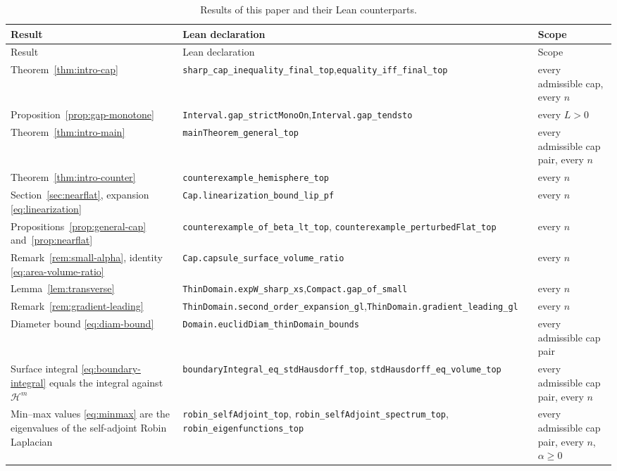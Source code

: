 \documentclass[11pt,a4paper]{article}
\numberwithin{equation}{section}
\theoremstyle{paperplain}
\theoremstyle{remark}
\newcommand{\HH}{\mathcal{H}}
\newcommand{\lean}[1]{\texttt{#1}}
\newcommand{\leangeneralname}{\lean{mainTheorem\_general\_top}}
\begin{document}
\begingroup
\small
\begin{longtable}{@{}>{\raggedright\arraybackslash}p{}>{\raggedright\arraybackslash}p{}>{\raggedright\arraybackslash}p{}@{}}
\caption{Results of this paper and their Lean counterparts.}\label{tab:formal}\\
\toprule
Result & Lean declaration & Scope\\
\midrule
\endfirsthead
\toprule
Result & Lean declaration & Scope\\
\midrule
\endhead
\bottomrule
\endfoot
Theorem~\ref{thm:intro-cap} &
\lean{sharp\_cap\_inequality\_final\_top},\newline \lean{equality\_iff\_final\_top} &
every admissible cap, every $n$\\[.4em]
Proposition~\ref{prop:gap-monotone} &
\lean{Interval.gap\_strictMonoOn},\newline \lean{Interval.gap\_tendsto} & every $L>0$\\[.4em]

Theorem~\ref{thm:intro-main} &
\leangeneralname & every admissible cap pair, every $n$\\[.4em]

Theorem~\ref{thm:intro-counter} &
\lean{counterexample\_hemisphere\_top} &
every $n$\\[.4em]
Section~\ref{sec:nearflat}, expansion \eqref{eq:linearization} &
\lean{Cap.linearization\_bound\_lip\_pf} &
every $n$\\[.4em]
Propositions~\ref{prop:general-cap} and~\ref{prop:nearflat} &
\lean{counterexample\_of\_beta\_lt\_top},\newline
\lean{counterexample\_perturbedFlat\_top} &
every $n$\\[.4em]
Remark~\ref{rem:small-alpha}, identity \eqref{eq:area-volume-ratio} &
\lean{Cap.capsule\_surface\_volume\_ratio} & every $n$\\[.4em]
Lemma~\ref{lem:transverse} &
\lean{ThinDomain.expW\_sharp\_xs},\newline \lean{Compact.gap\_of\_small} & every $n$\\[.4em]
Remark~\ref{rem:gradient-leading} &
\lean{ThinDomain.second\_order\_expansion\_gl},\newline \lean{ThinDomain.gradient\_leading\_gl} &
every $n$\\[.4em]
Diameter bound \eqref{eq:diam-bound} &
\lean{Domain.euclidDiam\_thinDomain\_bounds} &
every admissible cap pair\\[.4em]
Surface integral \eqref{eq:boundary-integral} equals the integral
against $\HH^m$ &
\lean{boundaryIntegral\_eq\_stdHausdorff\_top},\newline
\lean{stdHausdorff\_eq\_volume\_top} &
every admissible cap pair, every $n$\\[.4em]
Min--max values \eqref{eq:minmax} are the eigenvalues of the self-adjoint
Robin Laplacian &
\lean{robin\_selfAdjoint\_top},\newline
\lean{robin\_selfAdjoint\_spectrum\_top},\newline
\lean{robin\_eigenfunctions\_top} &
every admissible cap pair, every $n$, $\alpha\ge0$\\
\end{longtable}
\endgroup
\end{document}

